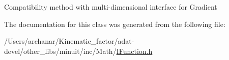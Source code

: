 Compatibility method with multi-\/dimensional interface for Gradient 

The documentation for this class was generated from the following file\+:\begin{DoxyCompactItemize}
\item 
/\+Users/archanar/\+Kinematic\+\_\+factor/adat-\/devel/other\+\_\+libs/minuit/inc/\+Math/\mbox{\hyperlink{adat-devel_2other__libs_2minuit_2inc_2Math_2IFunction_8h}{I\+Function.\+h}}\end{DoxyCompactItemize}
